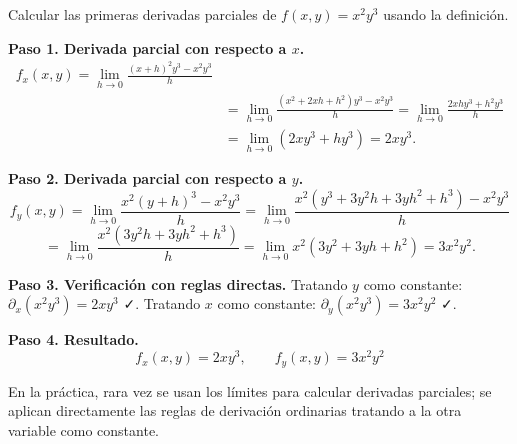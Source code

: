 \begin{example}
Calcular las primeras derivadas parciales de $f(x,y)=x^2 y^3$ usando
la definición.
\begin{myproof}
\textbf{Paso 1. Derivada parcial con respecto a $x$.}
\begin{align*}
f_x(x,y) = \lim_{h\to 0} \frac{(x+h)^2 y^3 - x^2 y^3}{h}\\
&= \lim_{h\to 0} \frac{(x^2+2xh+h^2)y^3 - x^2 y^3}{h}
= \lim_{h\to 0} \frac{2xhy^3 + h^2 y^3}{h}\\
&= \lim_{h\to 0} (2xy^3 + h y^3)
= 2xy^3.
\end{align*}



\textbf{Paso 2. Derivada parcial con respecto a $y$.}
\[
f_y(x,y) = \lim_{h\to 0} \frac{x^2(y+h)^3 - x^2 y^3}{h}
= \lim_{h\to 0} \frac{x^2(y^3+3y^2h+3yh^2+h^3) - x^2y^3}{h}
\]
\[
= \lim_{h\to 0} \frac{x^2(3y^2h+3yh^2+h^3)}{h}
= \lim_{h\to 0} x^2(3y^2+3yh+h^2)
= 3x^2y^2.
\]

\textbf{Paso 3. Verificación con reglas directas.}
Tratando $y$ como constante: $\partial_x(x^2y^3)=2xy^3$ ✓. Tratando $x$ como constante: $\partial_y(x^2y^3)=3x^2y^2$ ✓.

\textbf{Paso 4. Resultado.}
\[
\boxed{f_x(x,y)=2xy^3,\qquad f_y(x,y)=3x^2y^2}
\]
\end{myproof}
\end{example}

\begin{rem}
En la práctica, rara vez se usan los límites para calcular derivadas
parciales; se aplican directamente las reglas de derivación
ordinarias tratando a la otra variable como constante.
\end{rem}

